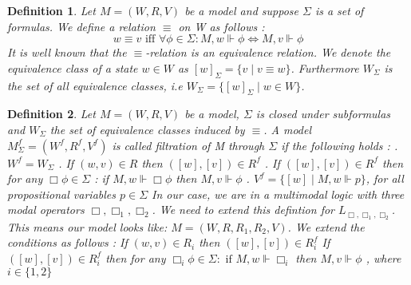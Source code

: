 \documentclass[12pt, a4paper]{scrartcl}
\newtheorem{definition}{Definition}[subsection]
\begin{document}
\begin{definition}
    Let $M = (W,R,V)$ be a model and suppose $\Sigma$ is a set of formulas. We define a relation $\equiv$ on W as follows : \newline 
    $$w \equiv v \mbox{ iff } \forall \phi \in \Sigma : M,w \Vdash \phi \Leftrightarrow M,v \Vdash \phi$$ 
    It is well known that the $\equiv$-relation is an equivalence relation. We denote the equivalence class of a state $w\in W$ as $[w]_\Sigma = \{v \mid v \equiv w\}$. Furthermore $W_\Sigma$ is the set of all equivalence classes, i.e
    $W_\Sigma = \{[w]_\Sigma \mid w \in W\}$.    
\end{definition}

\begin{definition}
    Let $M = (W,R,V)$ be a model, $\Sigma$ is closed under subformulas and $W_\Sigma$ the set of equivalence classes induced by $\equiv$.
    A model $M^f_\Sigma = (W^f, R^f, V^f)$ is called filtration of M through $\Sigma$ if the following holds : \newline {}. $W^f = W_\Sigma$ . If $(w,v) \in R$ then $([w],[v]) \in R^f$ . If $([w], [v]) \in R^f$ then for any $\Box \phi \in \Sigma$ : if $M,w \Vdash \Box \phi$ then $M,v \Vdash \phi$  . $V^f = \{[w] \mid M,w \Vdash p\}$, for all propositional variables $p \in \Sigma$  
    \newline \newline
    In our case, we are in a multimodal logic with three modal operators $\Box, \Box_1,\Box_2$. We need to extend this defintion for  $L_{\Box,\Box_1,\Box_2}$. This means our model looks like:
    $M = (W, R,R_1, R_2,V)$. We extend the conditions as follows : \newline \newline
    If $ (w,v) \in R_i$ then $([w], [v]) \in R^f_i$ \newline
    If $ ([w], [v]) \in R^f_i$ then for any $\Box_i \phi \in \Sigma : \mbox{ if } M,w \Vdash \Box_i$ then $M,v \Vdash \phi$ ,  where $i \in \{1,2\}$    
\end{definition}
\end{document}
